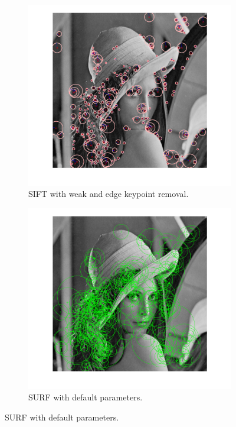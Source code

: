 \documentclass[12pt]{article}
\begin{document}
\begin{figure}[htbp!]
\begin{subfigure}[b]{0.49\textwidth}
                \includegraphics[width=\textwidth]{images/sift1}
                \caption{SIFT with weak and edge keypoint removal.}
                \label{fig:sift2}
        \end{subfigure}
        \begin{subfigure}[b]{0.49\textwidth}
                \includegraphics[width=\textwidth]{images/surf1}
                \caption{SURF with default parameters.}

\end{subfigure}
\end{figure}
\end{document}
